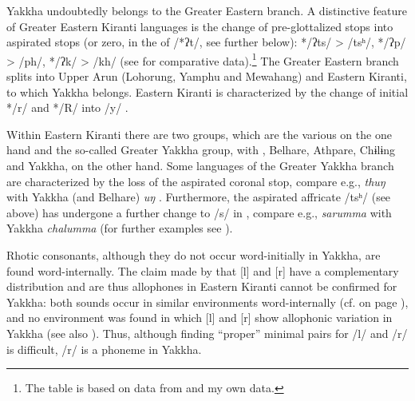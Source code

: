 Yakkha undoubtedly belongs to the Greater Eastern branch. A distinctive feature of Greater Eastern Kiranti languages is the change of pre-glottalized stops into aspirated stops  (or zero, in the  of /*ʔt/, see further below):  */ʔts/ > /tsʰ/, */ʔp/ > /ph/,  */ʔk/ > /kh/ (see  for comparative data).\footnote{The table is based on data from \citet{Driem1993A-grammar, Driem1987A-grammar, Bickeletal2009Puma, Kongren2007Yakkha} and my own data.} The Greater Eastern branch splits into Upper Arun (Lohorung, Yamphu and Mewahang) and Eastern Kiranti, to which Yakkha belongs. Eastern Kiranti is characterized by  the change of  initial */r/ and */R/ into /y/ \citep{Driem1990The-fall}.

Within Eastern Kiranti there are two groups, which are the various   on the one hand and the so-called Greater Yakkha group, with , Belhare, Athpare,  Chɨlɨng and Yakkha, on the other hand. Some languages of the Greater Yakkha branch are characterized by the loss of the aspirated coronal stop, compare e.g.,  \emph{thuŋ}  with Yakkha (and Belhare) \emph{uŋ} \citep{Bickel1997Dictionary}. Furthermore, the aspirated affricate /tsʰ/ (see above) has undergone a further change to /s/ in , compare e.g.,  \emph{sarumma} with Yakkha \emph{chalumma}  (for further examples see ). 

Rhotic consonants, although they do  not occur word-initially  in Yakkha, are found word-internally. The claim made by  \citet{Driem1990The-fall} that [l] and [r] have a complementary distribution and are thus allophones in Eastern Kiranti cannot be confirmed for Yakkha: both sounds occur in similar environments word-internally  (cf.   on page \pageref{r-l}), and no environment was found  in which [l] and [r] show allophonic variation  in Yakkha  (see also ). Thus, although finding “proper” minimal pairs for /l/ and /r/ is difficult, /r/ is a phoneme in Yakkha.

